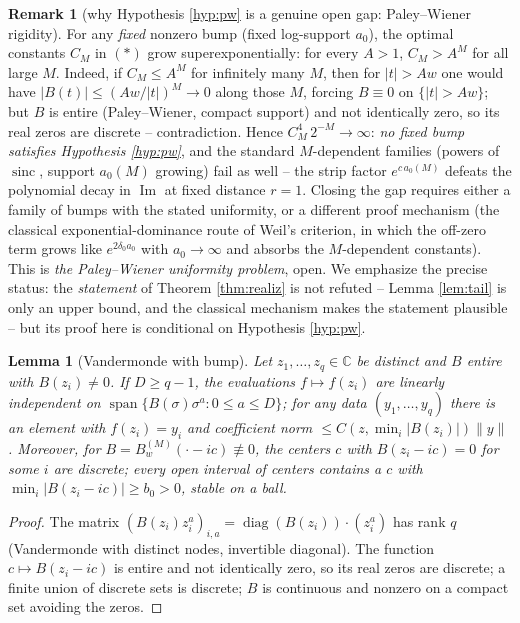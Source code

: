 \documentclass[11pt,reqno]{amsart}
\newtheorem{lemma}[theorem]{Lemma}
\theoremstyle{definition}
\newtheorem{remark}[theorem]{Remark}
\newcommand{\C}{\mathbb{C}}
\begin{document}
\begin{remark}[why Hypothesis \ref{hyp:pw} is a genuine open gap:
Paley--Wiener rigidity]\label{rem:pw-rigidity}
For any \emph{fixed} nonzero bump (fixed log-support \(a_0\)), the optimal
constants \(C_M\) in \((\ast)\) grow superexponentially: for every \(A>1\),
\(C_M>A^M\) for all large \(M\). Indeed, if \(C_M\leq A^M\) for infinitely many
\(M\), then for \(|t|>Aw\) one would have \(|B(t)|\leq(Aw/|t|)^M\to0\) along
those \(M\), forcing \(B\equiv0\) on \(\{|t|>Aw\}\); but \(B\) is entire
(Paley--Wiener, compact support) and not identically zero, so its real zeros
are discrete -- contradiction. Hence \(C_M^4\,2^{-M}\to\infty\): \emph{no fixed
bump satisfies Hypothesis \ref{hyp:pw}}, and the standard \(M\)-dependent
families (powers of \(\operatorname{sinc}\), support \(a_0(M)\) growing) fail
as well -- the strip factor \(e^{c\,a_0(M)}\) defeats the polynomial decay in
\(\operatorname{Im}\) at fixed distance \(r=1\). Closing the gap requires
either a family of bumps with the stated uniformity, or a different proof
mechanism (the classical exponential-dominance route of Weil's criterion, in
which the off-zero term grows like \(e^{2\delta_0 a_0}\) with \(a_0\to\infty\)
and absorbs the \(M\)-dependent constants). This is \emph{the Paley--Wiener uniformity problem}, open.
We emphasize the precise status: the \emph{statement} of Theorem
\ref{thm:realiz} is not refuted -- Lemma \ref{lem:tail} is only an upper bound,
and the classical mechanism makes the statement plausible -- but its proof here
is conditional on Hypothesis \ref{hyp:pw}.
\end{remark}

\begin{lemma}[Vandermonde with bump]\label{lem:vandermonde}
Let \(z_1,\dots,z_q\in\C\) be distinct and \(B\) entire with \(B(z_i)\neq0\). If
\(D\geq q-1\), the evaluations \(f\mapsto f(z_i)\) are linearly independent on
\(\operatorname{span}\{B(\sigma)\sigma^a:0\leq a\leq D\}\); for any data
\((y_1,\dots,y_q)\) there is an element with \(f(z_i)=y_i\) and coefficient norm
\(\leq C(z,\min_i|B(z_i)|)\|y\|\). Moreover, for
\(B=B^{(M)}_w(\cdot-ic)\not\equiv0\), the centers \(c\) with \(B(z_i-ic)=0\) for
some \(i\) are discrete; every open interval of centers contains a \(c\) with
\(\min_i|B(z_i-ic)|\geq b_0>0\), stable on a ball.
\end{lemma}

\begin{proof}
The matrix \((B(z_i)z_i^a)_{i,a}=\operatorname{diag}(B(z_i))\cdot(z_i^a)\) has
rank \(q\) (Vandermonde with distinct nodes, invertible diagonal). The function
\(c\mapsto B(z_i-ic)\) is entire and not identically zero, so its real zeros are
discrete; a finite union of discrete sets is discrete; \(B\) is continuous and
nonzero on a compact set avoiding the zeros.
\end{proof}
\end{document}
